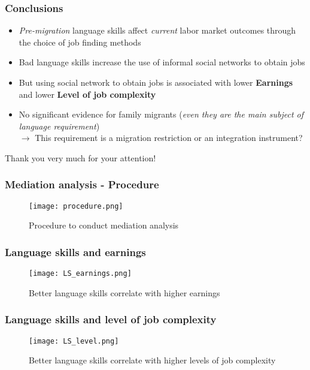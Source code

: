 \documentclass{beamer}
\begin{document}
\begin{frame}
\frametitle{Conclusions}
\begin{itemize}
\item \textit{Pre-migration} language skills affect \textit{current} labor market outcomes through the choice of job finding methods
\item Bad language skills increase the use of informal social networks to obtain jobs
\item But using social network to obtain jobs is associated with lower \textbf{Earnings} and lower \textbf{Level of job complexity}
\item No significant evidence for family migrants (\textit{even they are the main subject of language requirement}) \\
$\rightarrow$ This requirement is a migration restriction or an integration instrument?
\end{itemize}

\end{frame}

\begin{frame}

\Large{\centerline{Thank you very much for your attention!}}

\end{frame}

\begin{frame}
\frametitle{Mediation analysis - Procedure}
\begin{figure}
\centering
\texttt{[image: procedure.png]}
\caption{Procedure to conduct mediation analysis}
\end{figure}
\end{frame}

\begin{frame}
\frametitle{Language skills and earnings}

\begin{figure}
\centering
\texttt{[image: LS\_earnings.png]}
  \caption*{Better language skills correlate with higher earnings}
\end{figure}

\end{frame}


\begin{frame}
\frametitle{Language skills and level of job complexity}

\begin{figure}
\centering
\texttt{[image: LS\_level.png]}
  \caption*{Better language skills correlate with higher levels of job complexity}
\end{figure}

\end{frame}
\end{document}
